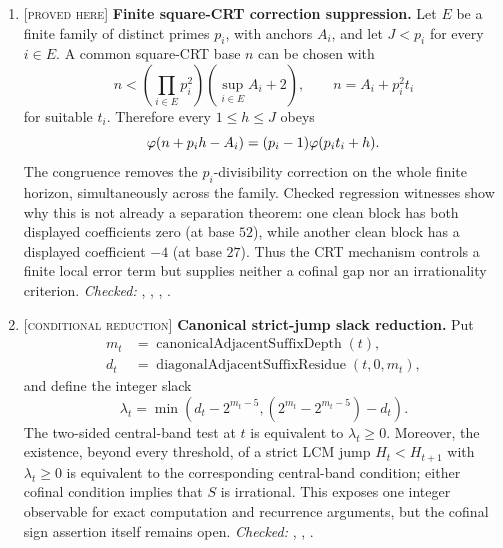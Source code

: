 \documentclass[11pt]{article}
\newcommand{\Stot}{S}
\newcommand{\stag}[1]{{\normalfont\footnotesize\textsc{[#1]}}}
\begin{document}
{\begin{enumerate}[label=\textbf{R\arabic*.},ref=R\arabic*,leftmargin=2.4em,
  itemsep=0.2em,topsep=0.25em]
\item\label{res:squarecrt} \stag{proved here}
\textbf{Finite square-CRT correction suppression.}  Let \(E\) be a finite
family of distinct primes \(p_i\), with anchors \(A_i\), and let \(J<p_i\) for
every \(i\in E\).  A common square-CRT base \(n\) can be chosen with
\[
 n<\left(\prod_{i\in E}p_i^2\right)(\sup_{i\in E}A_i+2),
 \qquad n=A_i+p_i^2t_i
\]
for suitable \(t_i\).  Therefore every \(1\le h\le J\) obeys
\[
 \varphi(n+p_i h-A_i)=(p_i-1)\varphi(p_i t_i+h).
\]
The congruence removes the \(p_i\)-divisibility correction on the whole
finite horizon, simultaneously across the family.  Checked regression
witnesses show why this is not already a separation theorem: one clean block
has both displayed coefficients zero (at base \(52\)), while another clean
block has a displayed coefficient \(-4\) (at base \(27\)).  Thus the CRT
mechanism controls a finite local error term but supplies neither a cofinal
gap nor an irrationality criterion.
{\footnotesize\emph{Checked:}
,
,
,
.}

\item\label{res:slackcriterion} \stag{conditional reduction}
\textbf{Canonical strict-jump slack reduction.}  Put
\[
 \begin{aligned}
 m_t&=\operatorname{canonicalAdjacentSuffixDepth}(t),\\
 d_t&=\operatorname{diagonalAdjacentSuffixResidue}(t,0,m_t),
 \end{aligned}
\]
and define the integer slack
\[
 \lambda_t=\min\!\left(d_t-2^{m_t-5},
       (2^{m_t}-2^{m_t-5})-d_t\right).
\]
The two-sided central-band test at $t$ is equivalent to
$\lambda_t\ge0$.  Moreover, the existence, beyond every threshold, of a
strict LCM jump $H_t<H_{t+1}$ with $\lambda_t\ge0$ is equivalent to the
corresponding central-band condition; either cofinal condition implies that
$\Stot$ is irrational.  This exposes one integer observable for exact
computation and recurrence arguments, but the cofinal sign assertion itself
remains open.
{\footnotesize\emph{Checked:}
,
,
.}


\end{enumerate}}
\end{document}
